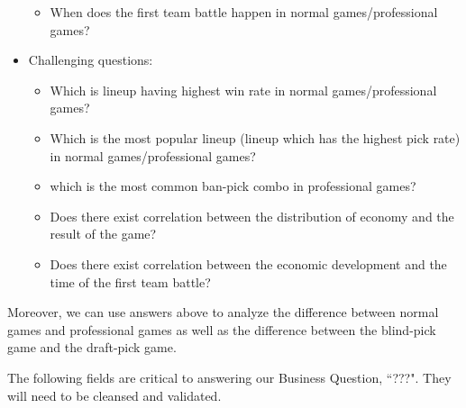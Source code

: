 \documentclass{article}
\begin{document}
\begin{itemize}
\begin{itemize}
        \item When does the first team battle happen in normal games/professional games?
    \end{itemize}
    \item Challenging questions:
    \begin{itemize}
        \item Which is lineup having highest win rate in normal games/professional games?
        \item Which is the most popular lineup (lineup which has the highest pick rate) in normal games/professional games?
        \item which is the most common ban-pick combo in professional games?
        \item Does there exist correlation between the distribution of economy and the result of the game?
        \item Does there exist correlation between the economic development and the time of the first team battle?
    \end{itemize}
\end{itemize}
Moreover, we can use answers above to analyze the difference between normal games and professional games as well as the difference between the blind-pick game and the draft-pick game.


The following fields are critical to answering our Business Question, ``???".
They will need to be cleansed and validated.




\end{document}
